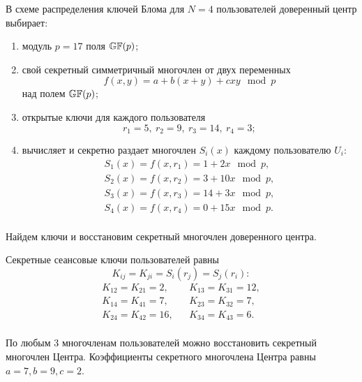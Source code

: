 \example
В схеме распределения ключей Блома для $N=4$ пользователей доверенный центр выбирает:
\begin{enumerate}
    \item модуль $p = 17$ поля $\mathbb{GF}(p)$;
    \item свой секретный симметричный многочлен от двух переменных
        \[ f(x,y) = a + b (x + y) + c x y \mod p \]
        над полем $\mathbb{GF}(p)$;
    \item открытые ключи для каждого пользователя
        \[ r_1 = 5, ~ r_2 = 9, ~ r_3 = 14, ~ r_4 = 3; \]
    \item вычисляет и секретно раздает многочлен $S_i(x)$ каждому пользователю $U_i$:
        \[ \begin{array}{l}
            S_1(x) = f(x, r_1) = 1 + 2x \mod p, \\
            S_2(x) = f(x, r_2) = 3 + 10x \mod p, \\
            S_3(x) = f(x, r_3) = 14 + 3x \mod p, \\
            S_4(x) = f(x, r_4) = 0 + 15x \mod p. \\
        \end{array} \]
\end{enumerate}
Найдем ключи и восстановим секретный многочлен доверенного центра.

Секретные сеансовые ключи пользователей равны
    \[ K_{ij} = K_{ji} = S_i(r_j) = S_j(r_i): \]
\[ \begin{array}{lcl}
    K_{12} = K_{21} = 2, & & K_{13} = K_{31} = 12, \\
    K_{14} = K_{41} = 7, & & K_{23} = K_{32} = 7, \\
    K_{24} = K_{42} = 16, & & K_{34} = K_{43} = 6. \\
\end{array} \]

По любым 3 многочленам пользователей можно восстановить секретный многочлен Центра. Коэффициенты секретного многочлена Центра равны $a=7, b=9, c=2$.
\exampleend

%
%
%
%
